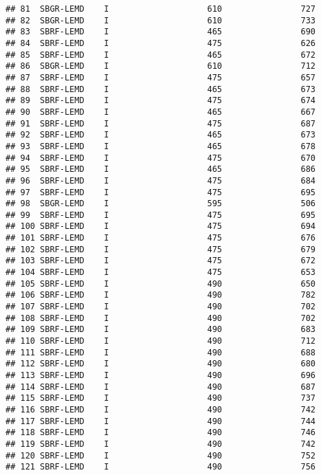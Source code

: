 \documentclass[
]{article}
\begin{document}
\begin{verbatim}
## 81  SBGR-LEMD    I                    610                727
## 82  SBGR-LEMD    I                    610                733
## 83  SBRF-LEMD    I                    465                690
## 84  SBRF-LEMD    I                    475                626
## 85  SBRF-LEMD    I                    465                672
## 86  SBGR-LEMD    I                    610                712
## 87  SBRF-LEMD    I                    475                657
## 88  SBRF-LEMD    I                    465                673
## 89  SBRF-LEMD    I                    475                674
## 90  SBRF-LEMD    I                    465                667
## 91  SBRF-LEMD    I                    475                687
## 92  SBRF-LEMD    I                    465                673
## 93  SBRF-LEMD    I                    465                678
## 94  SBRF-LEMD    I                    475                670
## 95  SBRF-LEMD    I                    465                686
## 96  SBRF-LEMD    I                    475                684
## 97  SBRF-LEMD    I                    475                695
## 98  SBGR-LEMD    I                    595                506
## 99  SBRF-LEMD    I                    475                695
## 100 SBRF-LEMD    I                    475                694
## 101 SBRF-LEMD    I                    475                676
## 102 SBRF-LEMD    I                    475                679
## 103 SBRF-LEMD    I                    475                672
## 104 SBRF-LEMD    I                    475                653
## 105 SBRF-LEMD    I                    490                650
## 106 SBRF-LEMD    I                    490                782
## 107 SBRF-LEMD    I                    490                702
## 108 SBRF-LEMD    I                    490                702
## 109 SBRF-LEMD    I                    490                683
## 110 SBRF-LEMD    I                    490                712
## 111 SBRF-LEMD    I                    490                688
## 112 SBRF-LEMD    I                    490                680
## 113 SBRF-LEMD    I                    490                696
## 114 SBRF-LEMD    I                    490                687
## 115 SBRF-LEMD    I                    490                737
## 116 SBRF-LEMD    I                    490                742
## 117 SBRF-LEMD    I                    490                744
## 118 SBRF-LEMD    I                    490                746
## 119 SBRF-LEMD    I                    490                742
## 120 SBRF-LEMD    I                    490                752
## 121 SBRF-LEMD    I                    490                756

\end{verbatim}
\end{document}
